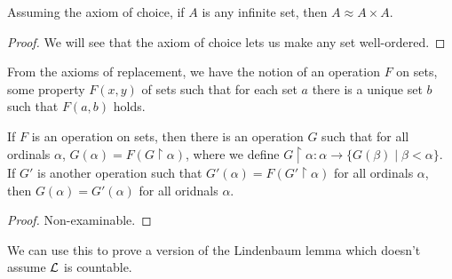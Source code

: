 \documentclass{article}
\begin{document}
\begin{corollary}
    Assuming the axiom of choice, if $A$ is any infinite set, then $A\approx A\times A$.\begin{proof}
        We will see that the axiom of choice lets us make any set well-ordered.
    \end{proof}
\end{corollary}

From the axioms of replacement, we have the notion of an operation $F$ on sets, some property $F(x,y)$ of sets such that for each set $a$ there is a unique set $b$ such that $F(a,b)$ holds.

\begin{theorem}
    If $F$ is an operation on sets, then there is an operation $G$ such that for all ordinals $\alpha$, $G(\alpha) = F(G\restriction \alpha)$, where we define $G\restriction \alpha:\alpha \rightarrow \{G(\beta) \mid \beta <\alpha\}$. If $G'$ is another operation such that $G'(\alpha) = F(G'\restriction \alpha)$ for all ordinals $\alpha$, then $G(\alpha) = G'(\alpha)$ for all oridnals $\alpha$.
    \begin{proof}
        Non-examinable.
    \end{proof}
\end{theorem}

We can use this to prove a version of the Lindenbaum lemma which doesn't assume $\mathcal{L}$ is countable.
\end{document}
